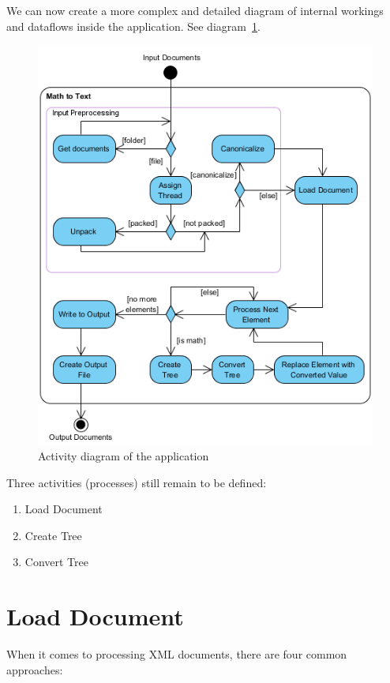 \documentclass[11pt,oneside,final]{fithesis2}
\begin{document}
We can now create a more complex and detailed diagram of internal workings and dataflows inside the application. See diagram~\ref{fig:activitydiagramall}. 

\begin{figure}[!ht]
\centering
\includegraphics[width=\textwidth]{activity_diagram_all}
\caption{Activity diagram of the application}
\label{fig:activitydiagramall}
\end{figure}

Three activities (processes) still remain to be defined:
\begin{enumerate}
\item Load Document
\item Create Tree
\item Convert Tree
\end{enumerate}

\section{Load Document}
\label{section:loaddocument}
When it comes to processing XML documents, there are four common approaches:
\end{document}
